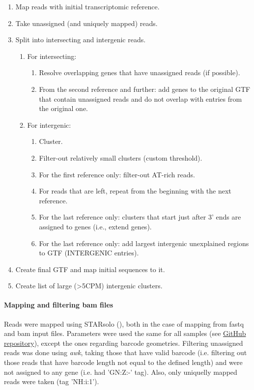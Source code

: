 \begin{enumerate}
    \item Map reads with initial transcriptomic reference.
    \item Take unassigned (and uniquely mapped) reads.
    \item Split into intersecting and intergenic reads.
    \begin{enumerate}
        \item For intersecting:
        \begin{enumerate}
            \item Resolve overlapping genes that have unassigned reads (if possible).
            \item From the second reference and further: add genes to the original GTF that contain unassigned reads
            and do not overlap with entries from the original one.
        \end{enumerate}
        \item For intergenic:
        \begin{enumerate}
            \item Cluster.
            \item Filter-out relatively small clusters (custom threshold).
            \item For the first reference only: filter-out AT-rich reads.
            \item For reads that are left, repeat from the beginning with the next reference.
            \item For the last reference only: clusters that start just after 3' ends are assigned to genes (i.e., extend genes).
            \item For the last reference only: add largest intergenic unexplained regions to GTF (INTERGENIC entries).
        \end{enumerate}
    \end{enumerate}
    \item Create final GTF and map initial sequences to it.
    \item Create list of large (\textgreater 5CPM) intergenic clusters.
\end{enumerate}

\paragraph{Mapping and filtering bam files}
Reads were mapped using STARsolo (\cite{Kaminow2021}), both in the case of mapping from fastq and bam input files.
Parameters were used the same for all samples (see \href{https://github.com/JuozapasI/MasterThesis/}{GitHub repository}), except the ones regarding barcode geometries.
Filtering unassigned reads was done using \textit{awk}, taking those that have valid barcode
(i.e. filtering out those reads that have barcode length not equal to the defined length)
and were not assigned to any gene (i.e. had 'GN:Z:-' tag).
Also, only uniquelly mapped reads were taken (tag 'NH:i:1').

